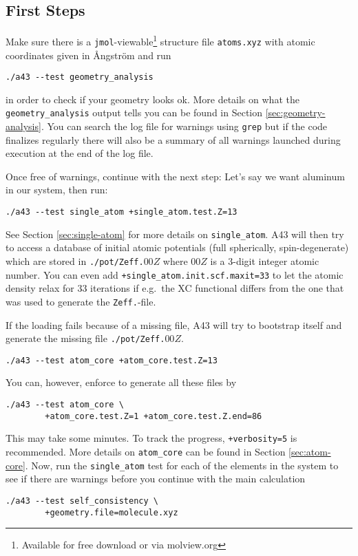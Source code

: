\documentclass[oribibl]{llncs}
\newcommand{\ttt}[1]{\texttt{#1}}
\newcommand{\codename}{A43}
\begin{document}
\subsection{First Steps} \label{sec:first-steps}
%
Make sure there is a \ttt{jmol}-viewable\footnote{Available for free download or via molview.org} structure file \ttt{atoms.xyz}
with atomic coordinates given in \AA{}ngstr\"{o}m and run
\begin{verbatim}
./a43 --test geometry_analysis
\end{verbatim}
in order to check if your geometry looks ok.
More details on what the \ttt{geometry\_analysis} output tells you can be found in Section \ref{sec:geometry-analysis}.
You can search the log file for warnings using \ttt{grep} but
if the code finalizes regularly
there will also be a summary of all warnings launched during execution at the end of the log file.
%

\noindent
Once free of warnings, continue with the next step:
Let's say we want aluminum in our system, then run:
\begin{verbatim}
./a43 --test single_atom +single_atom.test.Z=13
\end{verbatim}
See Section \ref{sec:single-atom} for more details on \ttt{single\_atom}.
%
\noindent
\codename{} will then try to access a database of initial atomic potentials
(full spherically, spin-degenerate) which are stored in \ttt{./pot/Zeff.}$00Z$
where $00Z$ is a 3-digit integer atomic number.
You can even add \ttt{+single\_atom.init.scf.maxit=33} to let the atomic density relax for $33$ iterations if e.g.~the \ac{XC} functional differs from the one that was used to generate the \ttt{Zeff.}-file.

\noindent
If the loading fails because of a missing file, 
\codename{} will try to bootstrap itself and generate the missing file \ttt{./pot/Zeff.}$00Z$.
\begin{verbatim}
./a43 --test atom_core +atom_core.test.Z=13
\end{verbatim}
You can, however, enforce to generate all these files by
\begin{verbatim}
./a43 --test atom_core \
        +atom_core.test.Z=1 +atom_core.test.Z.end=86
\end{verbatim}
This may take some minutes. To track the progress, \ttt{+verbosity=5} is recommended.
More details on \ttt{atom\_core} can be found in Section \ref{sec:atom-core}.
\todo[inline]{OpenMP would be good here}
%
\noindent
Now, run the \ttt{single\_atom} test for each of the elements in the system 
to see if there are warnings before you continue with the main calculation
\begin{verbatim}
./a43 --test self_consistency \
        +geometry.file=molecule.xyz
\end{verbatim}
%
\end{document}
